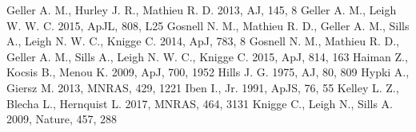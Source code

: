 \documentclass{aastex62}
\begin{document}
\begin{thebibliography}{}
 Geller A. M., Hurley J. R., Mathieu R. D. 2013, AJ, 145, 8
 Geller A. M., Leigh W. W. C. 2015, ApJL, 808, L25 
 Gosnell N. M., Mathieu R. D., Geller A. M., Sills A., Leigh N. W. C., Knigge C. 2014, ApJ, 783, 8
 Gosnell N. M., Mathieu R. D., Geller A. M., Sills A., Leigh N. W. C., Knigge C. 2015, ApJ, 814, 163
 Haiman Z., Kocsis B., Menou K. 2009, ApJ, 700, 1952  
 Hills J. G. 1975, AJ, 80, 809
 Hypki A., Giersz M. 2013,
MNRAS, 429, 1221
  Iben I., Jr. 1991, ApJS, 76, 55
 Kelley L. Z., Blecha L., Hernquist L. 2017, MNRAS, 464, 3131 
 Knigge C., Leigh
  N., Sills A. 2009, Nature, 457, 288

\end{thebibliography}
\end{document}
